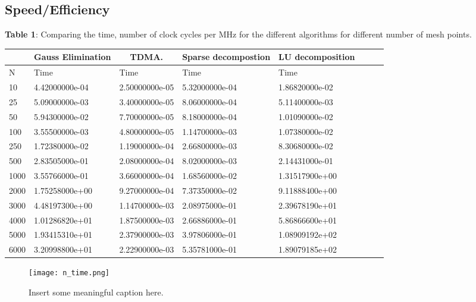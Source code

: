 \documentclass[11pt,a4paper,english,final]{article}
\numberwithin{equation}{section}
\begin{document}
\subsection{Speed/Efficiency}

\begin{center}
\textbf{Table 1}: Comparing the time, number of clock cycles per MHz for the different algorithms for different number of mesh points.  

\begin{tabular}{|l|l|l|l|l|l|l|l|}
\hline
\multicolumn{1}{|c|}{ } & \multicolumn{1}{|c|}{Gauss Elimination} & \multicolumn{1}{|c|}{TDMA.} & \multicolumn{1}{|c|}{Sparse decompostion} & \multicolumn{1}{|c|}{LU decomposition}  \\
\hline
N & Time & Time & Time & Time  \\
\hline
10 & 4.42000000e-04 &   2.50000000e-05 &   5.32000000e-04 & 1.86820000e-02 \\
25 & 5.09000000e-03 &   3.40000000e-05 &   8.06000000e-04 & 5.11400000e-03 \\
50 & 5.94300000e-02 &   7.70000000e-05 &   8.18000000e-04 & 1.01090000e-02 \\
100 & 3.55500000e-03 &   4.80000000e-05 &   1.14700000e-03 & 1.07380000e-02 \\
250 & 1.72380000e-02 &   1.19000000e-04 &   2.66800000e-03 & 8.30680000e-02 \\
500 & 2.83505000e-01 &   2.08000000e-04 &   8.02000000e-03 & 2.14431000e-01 \\
1000 & 3.55766000e-01 &   3.66000000e-04 &   1.68560000e-02 & 1.31517900e+00 \\
2000 & 1.75258000e+00 &   9.27000000e-04 &   7.37350000e-02 & 9.11888400e+00 \\
3000 & 4.48197300e+00 &   1.14700000e-03 &   2.08975000e-01 & 2.39678190e+01 \\
4000 & 1.01286820e+01 &   1.87500000e-03 &   2.66886000e-01 & 5.86866600e+01 \\
5000 & 1.93415310e+01 &   2.37900000e-03 &   3.97806000e-01 & 1.08909192e+02 \\
6000 & 3.20998800e+01 &   2.22900000e-03 &   5.35781000e-01 & 1.89079185e+02 \\
\hline
\end{tabular}
\end{center}

\begin{figure}[h!]
\centering
  \texttt{[image: n\_time.png]}
  \caption{Insert some meaningful caption here. }
\end{figure}
\end{document}
